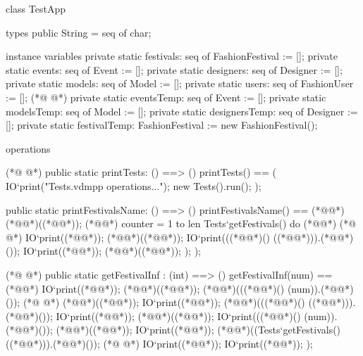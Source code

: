 \begin{vdmpp}[breaklines=true]
class TestApp

types
public String = seq of char;

instance variables
private  static festivals: seq of FashionFestival := [];
private  static events: seq of Event := [];
private  static designers: seq of Designer := [];
private  static models: seq of Model := [];
private  static users: seq of FashionUser := [];
(*@
\label{printTests:12}
@*)
private static eventsTemp: seq of Event := [];
private static modelsTemp: seq of Model := [];
private static designersTemp: seq of Designer := [];
private static festivalTemp: FashionFestival := new FashionFestival();

operations

(*@
\label{printFestivals:19}
@*)
public static printTests: () ==> ()
 printTests() == 
 (
  IO`print("\nExecuting Tests.vdmpp operations...\n");
    new Tests().run();   
   );
   
  
  public static printFestivalsName: () ==> ()
 printFestivalsName() ==
 (*@\vdmnotcovered{(}@*) 
 (*@@*)((*@@*));
 (*@@*) counter = 1 to len Tests`getFestivals() do (*@\vdmnotcovered{(}@*)
(*@
\label{printEvents:32}
@*)
    IO`print((*@@*));
    (*@@*)((*@@*));
    IO`print(((*@@*)() ((*@@*))).(*@@*)());
    IO`print((*@@*));
    (*@@*)((*@@*));
   );
  );   
  
   
(*@
\label{printFestivalsName:41}
@*)
 public static getFestivalInf : (int) ==> ()
  getFestivalInf(num) == (*@\vdmnotcovered{(}@*)
      IO`print((*@@*));
    (*@@*)((*@@*));
    (*@@*)(((*@@*)() (num)).(*@@*)());
(*@
\label{printDesigners:46}
@*)
    (*@@*)((*@@*));
    IO`print((*@@*));
    (*@@*)(((*@@*)() ((*@@*))).(*@@*)());
    IO`print((*@@*));
    (*@@*)((*@@*));
    IO`print(((*@@*)() (num)).(*@@*)());
    (*@@*)((*@@*));
    IO`print((*@@*));
    (*@@*)((Tests`getFestivals() ((*@@*))).(*@@*)());
(*@
\label{getFestivalInf:55}
@*)
    IO`print((*@@*));
    IO`print((*@@*));
  );
  


\end{vdmpp}
